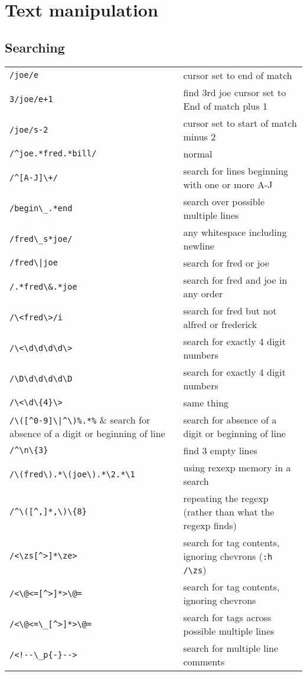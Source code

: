 \section{Text manipulation}

\subsection{Searching}
\begin{center}
\begin{longtable}{l|l}
\verb!/joe/e! & cursor set to end of match\\
\verb!3/joe/e+1! & find 3rd joe cursor set to End of match plus 1\\
\verb!/joe/s-2! & cursor set to start of match minus 2\\
\verb!/^joe.*fred.*bill/! & normal\\
\verb!/^[A-J]\+/! & search for lines beginning with one or more A-J\\
\verb!/begin\_.*end! & search over possible multiple lines\\
\verb!/fred\_s*joe/! & any whitespace including newline\\
\verb!/fred\|joe! & search for fred or joe\\
\verb!/.*fred\&.*joe! & search for fred and joe in any order\\
\verb!/\<fred\>/i! & search for fred but not alfred or frederick\\
\verb!/\<\d\d\d\d\>! & search for exactly 4 digit numbers\\
\verb!/\D\d\d\d\d\D! & search for exactly 4 digit numbers\\
\verb!/\<\d\{4}\>! & same thing\\
\verb!/\([^0-9]\|^\)%.*%! & search for absence of a digit or beginning of line\\
\verb!/^\n\{3}! & find 3 empty lines\\
\verb!/\(fred\).*\(joe\).*\2.*\1! &  using rexexp memory in a search \\
\verb!/^\([^,]*,\)\{8}! & repeating the regexp (rather than what the regexp finds) \\
\verb!/<\zs[^>]*\ze>! & search for tag contents, ignoring chevrons (\verb!:h /\zs!) \\
\verb!/<\@<=[^>]*>\@=! & search for tag contents, ignoring chevrons\\
\verb!/<\@<=\_[^>]*>\@=! & search for tags across possible multiple lines\\
\verb?/<!--\_p{-}-->? & search for multiple line comments\\

\end{longtable}
\end{center}
